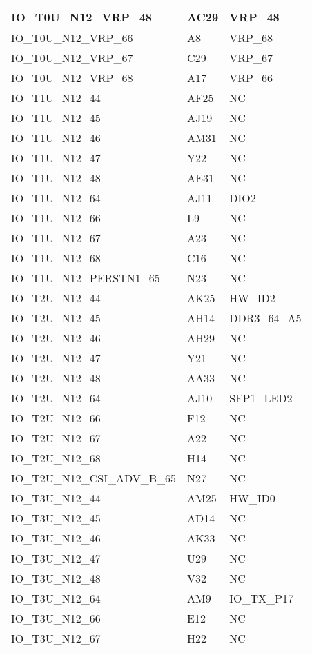 \begin{footnotesize}
\begin{longtable}{|p{7cm}|p{1cm}|p{5cm}|}
IO\_T0U\_N12\_VRP\_48	&	AC29	&	VRP\_48	\\ \hline
IO\_T0U\_N12\_VRP\_66	&	A8	&	VRP\_68	\\ \hline
IO\_T0U\_N12\_VRP\_67	&	C29	&	VRP\_67	\\ \hline
IO\_T0U\_N12\_VRP\_68	&	A17	&	VRP\_66	\\ \hline
IO\_T1U\_N12\_44	&	AF25	&	NC	\\ \hline
IO\_T1U\_N12\_45	&	AJ19	&	NC	\\ \hline
IO\_T1U\_N12\_46	&	AM31	&	NC	\\ \hline
IO\_T1U\_N12\_47	&	Y22	&	NC	\\ \hline
IO\_T1U\_N12\_48	&	AE31	&	NC	\\ \hline
IO\_T1U\_N12\_64	&	AJ11	&	DIO2	\\ \hline
IO\_T1U\_N12\_66	&	L9	&	NC	\\ \hline
IO\_T1U\_N12\_67	&	A23	&	NC	\\ \hline
IO\_T1U\_N12\_68	&	C16	&	NC	\\ \hline
IO\_T1U\_N12\_PERSTN1\_65	&	N23	&	NC	\\ \hline
IO\_T2U\_N12\_44	&	AK25	&	HW\_ID2	\\ \hline
IO\_T2U\_N12\_45	&	AH14	&	DDR3\_64\_A5	\\ \hline
IO\_T2U\_N12\_46	&	AH29	&	NC	\\ \hline
IO\_T2U\_N12\_47	&	Y21	&	NC	\\ \hline
IO\_T2U\_N12\_48	&	AA33	&	NC	\\ \hline
IO\_T2U\_N12\_64	&	AJ10	&	SFP1\_LED2	\\ \hline
IO\_T2U\_N12\_66	&	F12	&	NC	\\ \hline
IO\_T2U\_N12\_67	&	A22	&	NC	\\ \hline
IO\_T2U\_N12\_68	&	H14	&	NC	\\ \hline
IO\_T2U\_N12\_CSI\_ADV\_B\_65	&	N27	&	NC	\\ \hline
IO\_T3U\_N12\_44	&	AM25	&	HW\_ID0	\\ \hline
IO\_T3U\_N12\_45	&	AD14	&	NC	\\ \hline
IO\_T3U\_N12\_46	&	AK33	&	NC	\\ \hline
IO\_T3U\_N12\_47	&	U29	&	NC	\\ \hline
IO\_T3U\_N12\_48	&	V32	&	NC	\\ \hline
IO\_T3U\_N12\_64	&	AM9	&	IO\_TX\_P17	\\ \hline
IO\_T3U\_N12\_66	&	E12	&	NC	\\ \hline
IO\_T3U\_N12\_67	&	H22	&	NC	\\ \hline

\end{longtable}
\end{footnotesize}
